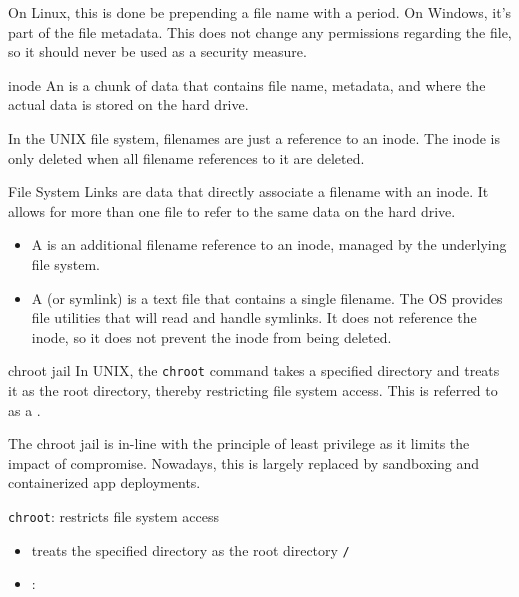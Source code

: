 \documentclass[code]{amznotes}
\begin{document}
On Linux, this is done be prepending a file name with a period. On Windows, it's part of the file metadata. This does not change any permissions regarding the file, so it should never be used as a security measure.

\begin{dfnbox}{inode}{}
    An  is a chunk of data that contains file name, metadata, and where the actual data is stored on the hard drive.
\end{dfnbox}

In the UNIX file system, filenames are just a reference to an inode. The inode is only deleted when all filename references to it are deleted.

\begin{dfnbox}{File System Links}{}
     are data that directly associate a filename with an inode. It allows for more than one file to refer to the same data on the hard drive.
    \begin{itemize}[noitemsep]
        \item A  is an additional filename reference to an inode, managed by the underlying file system.
        \item A  (or symlink) is a text file that contains a single filename. The OS provides file utilities that will read and handle symlinks. It does not reference the inode, so it does not prevent the inode from being deleted.
    \end{itemize}
\end{dfnbox}

\begin{dfnbox}{chroot jail}{}
    In UNIX, the \texttt{chroot} command takes a specified directory and treats it as the root directory, thereby restricting file system access. This is referred to as a .
\end{dfnbox}

The chroot jail is in-line with the principle of least privilege as it limits the impact of compromise. Nowadays, this is largely replaced by sandboxing and containerized app deployments.


\texttt{chroot}: restricts file system access
\begin{itemize}
    \item  treats the specified directory as the root directory \texttt{/}
    \item {}: 
\end{itemize}
\end{document}
